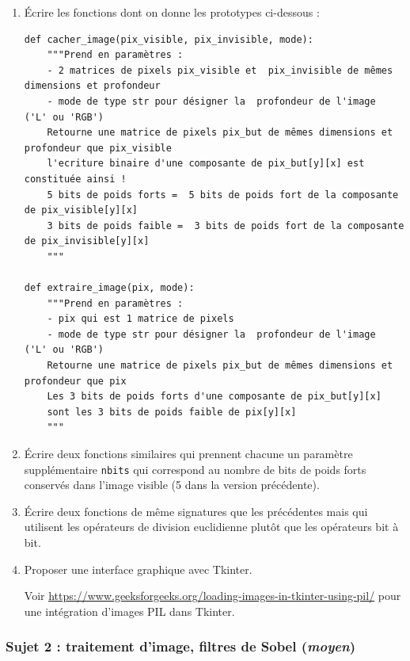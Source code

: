 \documentclass[a4paper, french, 12pt]{article}  %
\newcounter{def}
\begin{document}
\begin{enumerate}
	\item Écrire les fonctions dont on donne les prototypes ci-dessous :
	
\begin{lstlisting}[style=rond]
def cacher_image(pix_visible, pix_invisible, mode):
    """Prend en paramètres :
    - 2 matrices de pixels pix_visible et  pix_invisible de mêmes dimensions et profondeur
    - mode de type str pour désigner la  profondeur de l'image  ('L' ou 'RGB')
    Retourne une matrice de pixels pix_but de mêmes dimensions et profondeur que pix_visible
    l'ecriture binaire d'une composante de pix_but[y][x] est constituée ainsi !
    5 bits de poids forts =  5 bits de poids fort de la composante de pix_visible[y][x]
    3 bits de poids faible =  3 bits de poids fort de la composante de pix_invisible[y][x]
    """
    
def extraire_image(pix, mode):
    """Prend en paramètres :
    - pix qui est 1 matrice de pixels 
    - mode de type str pour désigner la  profondeur de l'image  ('L' ou 'RGB')
    Retourne une matrice de pixels pix_but de mêmes dimensions et profondeur que pix
    Les 3 bits de poids forts d'une composante de pix_but[y][x] 
    sont les 3 bits de poids faible de pix[y][x]
    """
\end{lstlisting}

\item Écrire deux fonctions similaires qui prennent chacune un paramètre supplémentaire \texttt{nbits} qui correspond au nombre de bits de poids forts conservés dans l'image visible (5 dans la version précédente).

\item Écrire deux fonctions de même signatures que les précédentes mais qui utilisent les opérateurs de division euclidienne plutôt que les opérateurs bit à bit.

\item Proposer une interface graphique avec Tkinter.

Voir \url{https://www.geeksforgeeks.org/loading-images-in-tkinter-using-pil/} pour une intégration d'images PIL dans Tkinter.
\end{enumerate}



\subsubsection{Sujet 2 : traitement d'image, filtres de Sobel (\textit{moyen})}
\end{document}
